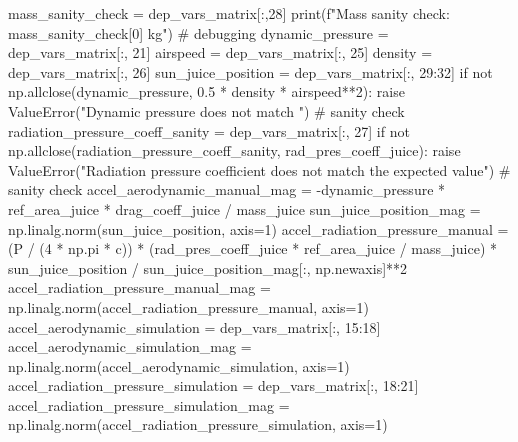 {}mass_sanity_check = dep_vars_matrix[:,28] print(f"Mass sanity check: {mass_sanity_check[0]} kg") # debugging\markdownRendererInterblockSeparator
{}
\markdownRendererSectionEnd \markdownRendererSectionBegin
{}\markdownRendererInterblockSeparator
{}
\markdownRendererSectionEnd \markdownRendererSectionBegin
{}\markdownRendererInterblockSeparator
{}dynamic_pressure = dep_vars_matrix[:, 21] airspeed = dep_vars_matrix[:, 25] density = dep_vars_matrix[:, 26] sun_juice_position = dep_vars_matrix[:, 29:32]\markdownRendererInterblockSeparator
{}
\markdownRendererSectionEnd \markdownRendererSectionBegin
{}\markdownRendererInterblockSeparator
{}if not np.allclose(dynamic_pressure, 0.5 * density * airspeed**2): raise ValueError("Dynamic pressure does not match ") # sanity check radiation_pressure_coeff_sanity = dep_vars_matrix[:, 27] if not np.allclose(radiation_pressure_coeff_sanity, rad_pres_coeff_juice): raise ValueError("Radiation pressure coefficient does not match the expected value") # sanity check\markdownRendererInterblockSeparator
{}
\markdownRendererSectionEnd \markdownRendererSectionBegin
{}\markdownRendererInterblockSeparator
{}accel_aerodynamic_manual_mag = -dynamic_pressure * ref_area_juice * drag_coeff_juice / mass_juice sun_juice_position_mag = np.linalg.norm(sun_juice_position, axis=1)\markdownRendererInterblockSeparator
{}
\markdownRendererSectionEnd \markdownRendererSectionBegin
{}\markdownRendererInterblockSeparator
{}accel_radiation_pressure_manual = (P / (4 * np.pi * c)) * (rad_pres_coeff_juice * ref_area_juice / mass_juice) * sun_juice_position / sun_juice_position_mag[:, np.newaxis]**2\markdownRendererInterblockSeparator
{}
\markdownRendererSectionEnd \markdownRendererSectionBegin
{}\markdownRendererInterblockSeparator
{}accel_radiation_pressure_manual_mag = np.linalg.norm(accel_radiation_pressure_manual, axis=1)\markdownRendererInterblockSeparator
{}
\markdownRendererSectionEnd \markdownRendererSectionBegin
{}\markdownRendererInterblockSeparator
{}accel_aerodynamic_simulation = dep_vars_matrix[:, 15:18] accel_aerodynamic_simulation_mag = np.linalg.norm(accel_aerodynamic_simulation, axis=1) accel_radiation_pressure_simulation = dep_vars_matrix[:, 18:21] accel_radiation_pressure_simulation_mag = np.linalg.norm(accel_radiation_pressure_simulation, axis=1)\markdownRendererInterblockSeparator
